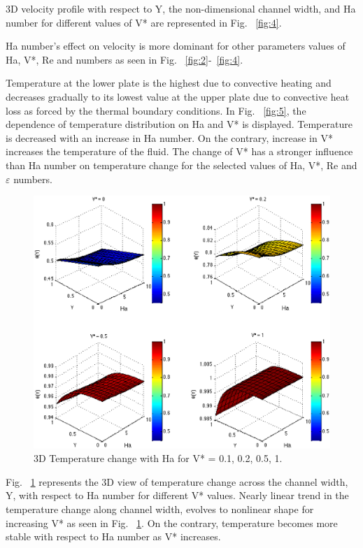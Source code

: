 3D velocity profile with respect to Y, the non-dimensional channel width, and Ha number for different values of V* are represented in Fig. ~\ref{fig:4}. 

Ha number's effect on velocity is more dominant for other parameters values of Ha, V*, Re and    numbers as seen in Fig. ~\ref{fig:2}-~\ref{fig:4}.

Temperature at the lower plate is the highest due to convective heating and decreases gradually to its lowest value at the upper plate due to convective heat loss as forced by the thermal boundary conditions. In Fig. ~\ref{fig:5}, the dependence of temperature distribution on Ha and V* is displayed. Temperature is decreased with an increase in Ha number. On the contrary, increase in V* increases the temperature of the fluid. The change of V* has a stronger influence than Ha number on temperature change for the selected values of Ha, V*, Re and $\varepsilon $  numbers.

\begin{figure}
  \includegraphics[scale=0.66]{figures/fig6.eps}
\caption{3D Temperature change with Ha for V* = 0.1, 0.2, 0.5, 1.}
\label{fig:6}       %
\end{figure}

Fig. ~\ref{fig:6} represents the 3D view of temperature change across the channel width, Y, with respect to Ha number for different V* values. Nearly linear trend in the temperature change along channel width, evolves to nonlinear shape for increasing V* as seen in Fig. ~\ref{fig:6}. On the contrary, temperature becomes more stable with respect to Ha number as V* increases. 

